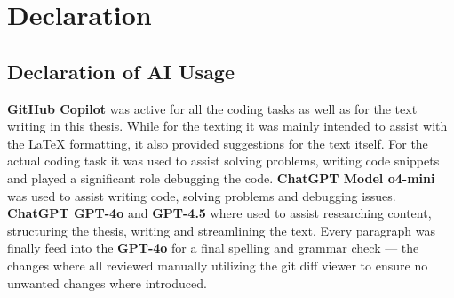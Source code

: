 


\section{Declaration}
\label{declaration}

\subsection{Declaration of AI Usage}%

\textbf{GitHub Copilot} was active for all the coding tasks as well as for the text writing in this thesis.
While for the texting it was mainly intended to assist with the LaTeX formatting, it also provided suggestions for the text itself.
For the actual coding task it was used to assist solving problems, writing code snippets and played a significant role debugging the code.
\textbf{ChatGPT Model o4-mini} was used to assist writing code, solving problems and debugging issues.
\textbf{ChatGPT GPT-4o} and \textbf{GPT-4.5} where used to assist researching content, structuring the thesis, writing and streamlining the text.
Every paragraph was finally feed into the \textbf{GPT-4o} for a final spelling and grammar check --- the changes where all reviewed manually utilizing the git diff viewer to ensure no unwanted changes where introduced.

\newpage
{}


